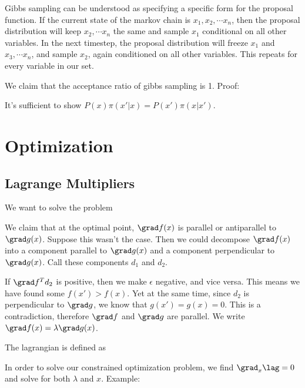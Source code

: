 \documentclass[12pt]{article}
\begin{document}
Gibbs sampling can be understood as specifying a specific form for the proposal function. If the current state of the markov chain is $x_1, x_2, \cdots x_n$, then the proposal distribution will keep $x_2, \cdots x_n$ the same and sample $x_1$ conditional on all other variables. In the next timestep, the proposal distribution will freeze $x_1$ and $x_3, \cdots x_n$, and sample $x_2$, again conditioned on all other variables. This repeats for every variable in our set. 

We claim that the acceptance ratio of gibbs sampling is 1. Proof:

It's sufficient to show $P(x)\pi(x'|x) = P(x')\pi(x|x')$.


\section{Optimization}

\subsection{Lagrange Multipliers}

We want to solve the problem


We claim that at the optimal point, $\grad f(x)$ is parallel or antiparallel to $\grad g(x)$. Suppose this wasn't the case. Then we could decompose $\grad f(x)$ into a component parallel to $\grad g(x)$ and a component perpendicular to $\grad g(x)$. Call these components $d_1$ and $d_2$. 


If $\grad f ^T d_2$ is positive, then we make $\epsilon$ negative, and vice versa. This means we have found some $f(x') > f(x)$. Yet at the same time, since $d_2$ is perpendicular to $\grad g$, we know that $g(x') = g(x) = 0$. This is a contradiction, therefore $\grad f$ and $\grad g$ are parallel. We write $\grad f(x) = \lambda \grad g(x)$.

The lagrangian is defined as


In order to solve our constrained optimization problem, we find $\grad_x \lag = 0$ and solve for both $\lambda$ and $x$. Example:
\end{document}
